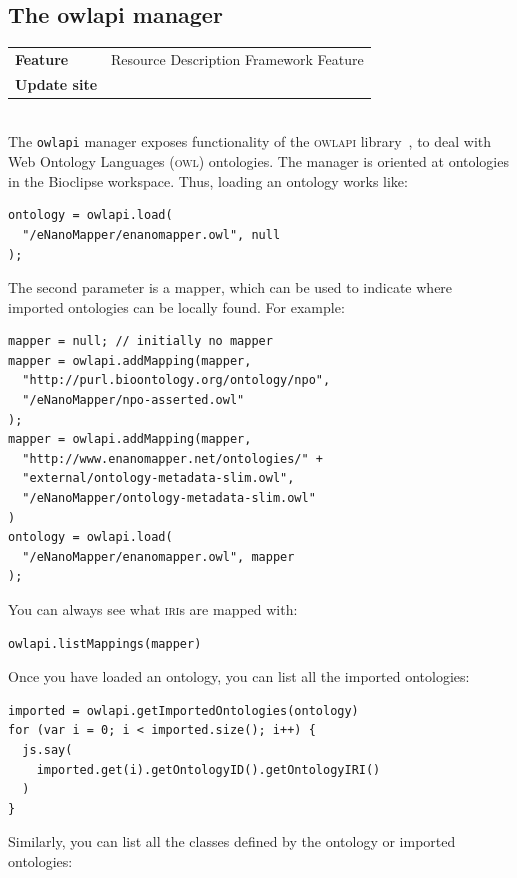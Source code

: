 \documentclass[a5paper, 10pt]{memoir}
\begin{document}
\begin{refsection}
\section{The owlapi manager}

\begin{tabular}{ll}
\textbf{Feature} & Resource Description Framework Feature \\
\textbf{Update site} & \url{} \\
\end{tabular} \\

\noindent
The \texttt{owlapi} manager exposes functionality of the
\textsc{owlapi} library~\cite{Horridge2011}, to deal with Web
Ontology Languages (\textsc{owl})
ontologies. The manager is oriented at ontologies in the Bioclipse workspace.
Thus, loading an ontology works like:

\begin{Verbatim}
ontology = owlapi.load(
  "/eNanoMapper/enanomapper.owl", null
);
\end{Verbatim}
The second parameter is a mapper, which can be used to indicate where imported
ontologies can be locally found. For example:

\begin{Verbatim}
mapper = null; // initially no mapper
mapper = owlapi.addMapping(mapper,
  "http://purl.bioontology.org/ontology/npo",
  "/eNanoMapper/npo-asserted.owl"
);
mapper = owlapi.addMapping(mapper,
  "http://www.enanomapper.net/ontologies/" + 
  "external/ontology-metadata-slim.owl",
  "/eNanoMapper/ontology-metadata-slim.owl"
)
ontology = owlapi.load(
  "/eNanoMapper/enanomapper.owl", mapper
);
\end{Verbatim}
You can always see what \textsc{iri}s are mapped with:

\begin{Verbatim}
owlapi.listMappings(mapper)
\end{Verbatim}
Once you have loaded an ontology, you can list all the imported
ontologies:

\begin{Verbatim}
imported = owlapi.getImportedOntologies(ontology)
for (var i = 0; i < imported.size(); i++) {
  js.say(
    imported.get(i).getOntologyID().getOntologyIRI()
  )
}
\end{Verbatim}
Similarly, you can list all the classes defined by the ontology or imported
ontologies:


\end{refsection}
\end{document}
